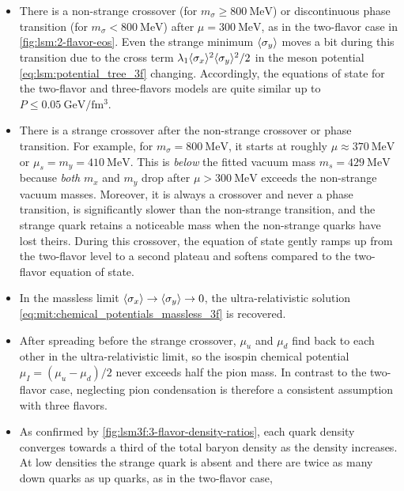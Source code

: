 \begin{itemize}
\item There is a non-strange crossover (for $m_\sigma \geq \SI{800}{\mega\electronvolt}$)
      or discontinuous phase transition (for $m_\sigma < \SI{800}{\mega\electronvolt}$)
      after $\mu=\SI{300}{\mega\electronvolt}$, as in the two-flavor case in \cref{fig:lsm:2-flavor-eos}.
      Even the strange minimum $\langle \sigma_y \rangle$ moves a bit during this transition
      due to the cross term $\lambda_1 \langle \sigma_x \rangle^2 \langle \sigma_y \rangle^2 / 2$ in the meson potential \eqref{eq:lsm:potential_tree_3f} changing.
      Accordingly, the equations of state for the two-flavor and three-flavors models are quite similar up to $P \leq \SI{0.05}{\giga\electronvolt\per\femto\meter\cubed}$.
\item There is a strange crossover after the non-strange crossover or phase transition.
      For example, for $m_\sigma=\SI{800}{\mega\electronvolt}$, it starts at roughly $\mu \approx \SI{370}{\mega\electronvolt}$ 
      or $\mu_s = m_y = \SI{410}{\mega\electronvolt}$.
      This is \emph{below} the fitted vacuum mass $m_s=\SI{429}{\mega\electronvolt}$
      because \emph{both} $m_x$ and $m_y$ drop after $\mu > \SI{300}{\mega\electronvolt}$ exceeds the non-strange vacuum masses.
      Moreover, it is always a crossover and never a phase transition,
      is significantly slower than the non-strange transition,
      and the strange quark retains a noticeable mass when the non-strange quarks have lost theirs.
      During this crossover, the equation of state gently ramps up from the two-flavor level to a second plateau
      and softens compared to the two-flavor equation of state.
\item In the massless limit $\langle \sigma_x \rangle \rightarrow \langle \sigma_y \rangle \rightarrow 0$, the ultra-relativistic solution \eqref{eq:mit:chemical_potentials_massless_3f} is recovered.
\item After spreading before the strange crossover, $\mu_u$ and $\mu_d$ find back to each other in the ultra-relativistic limit,
      so the isospin chemical potential $\mu_I=(\mu_u-\mu_d)/2$ never exceeds half the pion mass.
      In contrast to the two-flavor case, neglecting pion condensation is therefore a consistent assumption with three flavors.
\item As confirmed by \cref{fig:lsm3f:3-flavor-density-ratios}, each quark density converges towards a third of the total baryon density as the density increases.
      At low densities the strange quark is absent and there are twice as many down quarks as up quarks, as in the two-flavor case,

\end{itemize}
